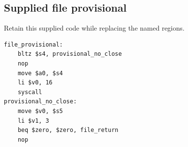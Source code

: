 \subsection*{Supplied file provisional}
Retain this supplied code while replacing the named regions.

\begin{verbatim}
file_provisional:
    bltz $s4, provisional_no_close
    nop
    move $a0, $s4
    li $v0, 16
    syscall
provisional_no_close:
    move $v0, $s5
    li $v1, 3
    beq $zero, $zero, file_return
    nop

\end{verbatim}
